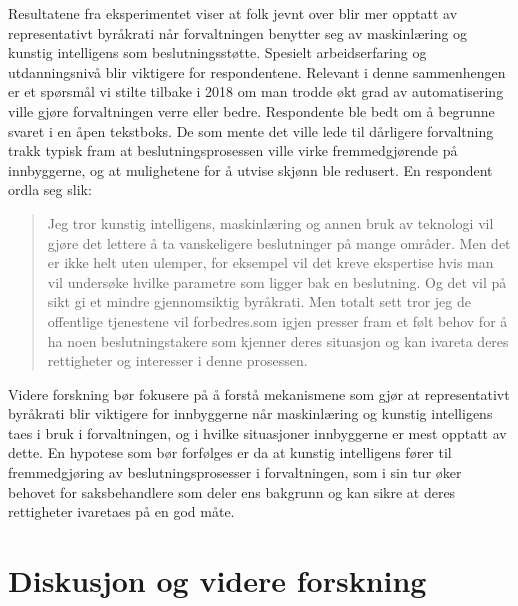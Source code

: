 \documentclass[
  12pt,
  a4paper, 12pt]{article}
\begin{document}
Resultatene fra eksperimentet viser at folk jevnt over blir mer opptatt av representativt byråkrati når forvaltningen benytter seg av maskinlæring og kunstig intelligens som beslutningsstøtte.
Spesielt arbeidserfaring og utdanningsnivå blir viktigere for respondentene.
Relevant i denne sammenhengen er et spørsmål vi stilte tilbake i 2018 om man trodde økt grad av automatisering ville gjøre forvaltningen verre eller bedre.
Respondente ble bedt om å begrunne svaret i en åpen tekstboks.
De som mente det ville lede til dårligere forvaltning trakk typisk fram at beslutningsprosessen ville virke fremmedgjørende på innbyggerne, og at mulighetene for å utvise skjønn ble redusert.
En respondent ordla seg slik:

\begin{quote}
Jeg tror kunstig intelligens, maskinlæring og annen bruk av teknologi vil gjøre det lettere å ta vanskeligere beslutninger på mange områder.
Men det er ikke helt uten ulemper, for eksempel vil det kreve ekspertise hvis man vil undersøke hvilke parametre som ligger bak en beslutning.
Og det vil på sikt gi et mindre gjennomsiktig byråkrati.
Men totalt sett tror jeg de offentlige tjenestene vil forbedres.som igjen presser fram et følt behov for å ha noen beslutningstakere som kjenner deres situasjon og kan ivareta deres rettigheter og interesser i denne prosessen.
\end{quote}

Videre forskning bør fokusere på å forstå mekanismene som gjør at representativt byråkrati blir viktigere for innbyggerne når maskinlæring og kunstig intelligens taes i bruk i forvaltningen, og i hvilke situasjoner innbyggerne er mest opptatt av dette.
En hypotese som bør forfølges er da at kunstig intelligens fører til fremmedgjøring av beslutningsprosesser i forvaltningen, som i sin tur øker behovet for saksbehandlere som deler ens bakgrunn og kan sikre at deres rettigheter ivaretaes på en god måte.

\newpage

\hypertarget{diskusjon-og-videre-forskning}{%
\section{Diskusjon og videre forskning}\label{diskusjon-og-videre-forskning}}
\end{document}
